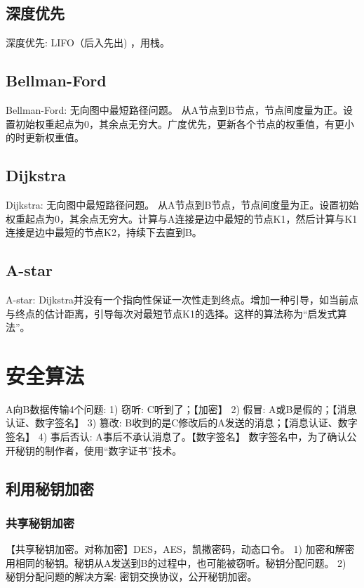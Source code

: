 \documentclass[UTF8]{../computerUniverse}
\begin{document}
\subsection{深度优先}
深度优先: LIFO（后入先出) ，用栈。


\subsection{Bellman-Ford}
Bellman-Ford: 无向图中最短路径问题。
从A节点到B节点，节点间度量为正。设置初始权重起点为0，其余点无穷大。广度优先，更新各个节点的权重值，有更小的时更新权重值。


\subsection{Dijkstra}
Dijkstra: 无向图中最短路径问题。
从A节点到B节点，节点间度量为正。设置初始权重起点为0，其余点无穷大。计算与A连接是边中最短的节点K1，然后计算与K1连接是边中最短的节点K2，持续下去直到B。


\subsection{A-star}
A-star: Dijkstra并没有一个指向性保证一次性走到终点。增加一种引导，如当前点与终点的估计距离，引导每次对最短节点K1的选择。这样的算法称为“启发式算法”。



\section{安全算法}

A向B数据传输4个问题: 
1) 窃听: C听到了；【加密】
2) 假冒: A或B是假的；【消息认证、数字签名】
3) 篡改: B收到的是C修改后的A发送的消息；【消息认证、数字签名】
4) 事后否认: A事后不承认消息了。【数字签名】
数字签名中，为了确认公开秘钥的制作者，使用“数字证书”技术。



\subsection{利用秘钥加密}

\subsubsection{共享秘钥加密}
【共享秘钥加密。对称加密】DES，AES，凯撒密码，动态口令。
1) 加密和解密用相同的秘钥。秘钥从A发送到B的过程中，也可能被窃听。秘钥分配问题。
2) 秘钥分配问题的解决方案: 密钥交换协议，公开秘钥加密。
\end{document}
